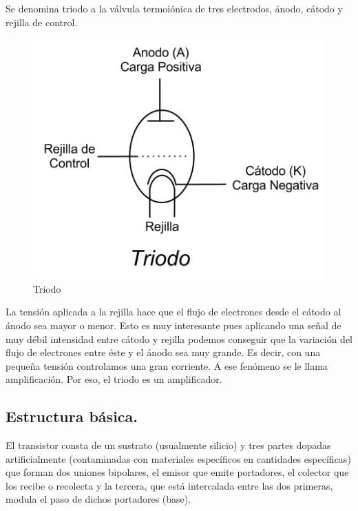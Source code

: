 \documentclass{article}
\begin{document}
Se denomina triodo a la válvula termoiónica de tres electrodos, ánodo,
cátodo y rejilla de control.

\begin{figure}[htbp]
\centering
\includegraphics{images/triodo.png}
\caption{Triodo}
\end{figure}

La tensión aplicada a la rejilla hace que el flujo de electrones desde
el cátodo al ánodo sea mayor o menor. Esto es muy interesante pues
aplicando una señal de muy débil intensidad entre cátodo y rejilla
podemos conseguir que la variación del flujo de electrones entre éste y
el ánodo sea muy grande. Es decir, con una pequeña tensión controlamos
una gran corriente. A ese fenómeno se le llama amplificación. Por eso,
el triodo es un amplificador.

\subsection{Estructura básica.}\label{estructura-buxe1sica.}

El transistor consta de un sustrato (usualmente silicio) y tres partes
dopadas artificialmente (contaminadas con materiales específicos en
cantidades específicas) que forman dos uniones bipolares, el emisor que
emite portadores, el colector que los recibe o recolecta y la tercera,
que está intercalada entre las dos primeras, modula el paso de dichos
portadores (base).
\end{document}
